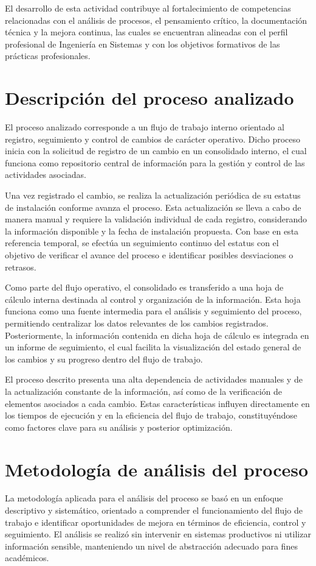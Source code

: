 \documentclass[12pt]{article}
\begin{document}
El desarrollo de esta actividad contribuye al fortalecimiento de competencias relacionadas con el análisis de procesos, el pensamiento crítico, la documentación técnica y la mejora continua, las cuales se encuentran alineadas con el perfil profesional de Ingeniería en Sistemas y con los objetivos formativos de las prácticas profesionales.


\section*{Descripción del proceso analizado}
El proceso analizado corresponde a un flujo de trabajo interno orientado al registro, seguimiento y control de cambios de carácter operativo. Dicho proceso inicia con la solicitud de registro de un cambio en un consolidado interno, el cual funciona como repositorio central de información para la gestión y control de las actividades asociadas.

Una vez registrado el cambio, se realiza la actualización periódica de su estatus de instalación conforme avanza el proceso. Esta actualización se lleva a cabo de manera manual y requiere la validación individual de cada registro, considerando la información disponible y la fecha de instalación propuesta. Con base en esta referencia temporal, se efectúa un seguimiento continuo del estatus con el objetivo de verificar el avance del proceso e identificar posibles desviaciones o retrasos.

Como parte del flujo operativo, el consolidado es transferido a una hoja de cálculo interna destinada al control y organización de la información. Esta hoja funciona como una fuente intermedia para el análisis y seguimiento del proceso, permitiendo centralizar los datos relevantes de los cambios registrados. Posteriormente, la información contenida en dicha hoja de cálculo es integrada en un informe de seguimiento, el cual facilita la visualización del estado general de los cambios y su progreso dentro del flujo de trabajo.

El proceso descrito presenta una alta dependencia de actividades manuales y de la actualización constante de la información, así como de la verificación de elementos asociados a cada cambio. Estas características influyen directamente en los tiempos de ejecución y en la eficiencia del flujo de trabajo, constituyéndose como factores clave para su análisis y posterior optimización.


\section*{Metodología de análisis del proceso}
La metodología aplicada para el análisis del proceso se basó en un enfoque descriptivo y sistemático, orientado a comprender el funcionamiento del flujo de trabajo e identificar oportunidades de mejora en términos de eficiencia, control y seguimiento. El análisis se realizó sin intervenir en sistemas productivos ni utilizar información sensible, manteniendo un nivel de abstracción adecuado para fines académicos.
\end{document}
